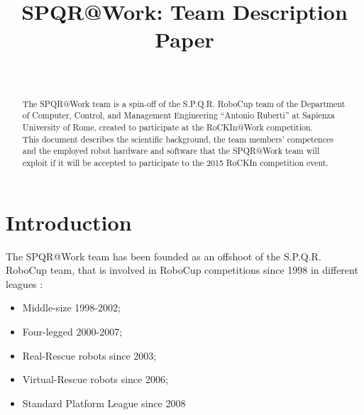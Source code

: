 \documentclass[conference]{IEEEtran}
\begin{document}
%
\title{SPQR@Work: Team Description Paper}

\author{\\
}


\maketitle

\begin{abstract}
The SPQR@Work team is a spin-off of the S.P.Q.R. RoboCup team of the Department of Computer, Control, and Management Engineering “Antonio Ruberti” at Sapienza University of Rome, created to participate at the RoCKIn@Work competition.\\
This document describes the scientific background, the team members' competences and the employed robot hardware and software that the SPQR@Work team will exploit if it will be accepted to participate to the 2015 RoCKIn competition event.
\end{abstract}

\section{Introduction}
The SPQR@Work team has been founded as an offshoot of the S.P.Q.R. RoboCup team, that is involved in RoboCup competitions since 1998 in different leagues :
\begin{itemize}
\item Middle-size 1998-2002;
\item Four-legged 2000-2007;
\item Real-Rescue robots since 2003;
\item Virtual-Rescue robots since 2006;
\item Standard Platform League since 2008
 \end{itemize}
\end{document}
